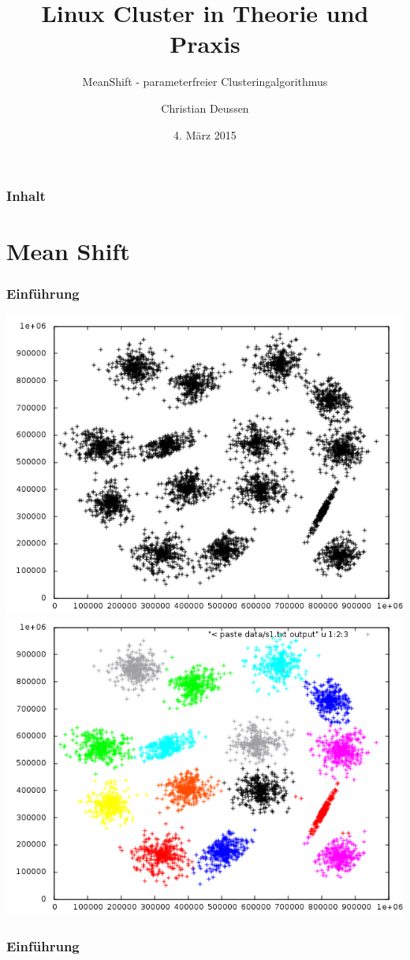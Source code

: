 \documentclass[10pt]{beamer}
\title{Linux Cluster in Theorie und Praxis}
\subtitle{MeanShift - parameterfreier Clusteringalgorithmus}
\author{Christian Deussen}
\date{4. M\"arz 2015}
\institute[ZIH TUD]{Zentrum f\"ur Informationsdienste und Hochleistungsrechnen -- TU Dresden}
\begin{document}
\zihmaketitle

\begin{frame}
\frametitle{Inhalt}
	\tableofcontents
\end{frame}

\section{Mean Shift}
\begin{frame}
	\frametitle{Einf\"uhrung}
	\includegraphics[scale=0.34, keepaspectratio]{../output/pics/s1_black.png}
	\includegraphics[scale=0.34, keepaspectratio]{../output/pics/s1_colored.png}
\end{frame}
\begin{frame}
	\frametitle{Einf\"uhrung}
\end{frame}
\end{document}
